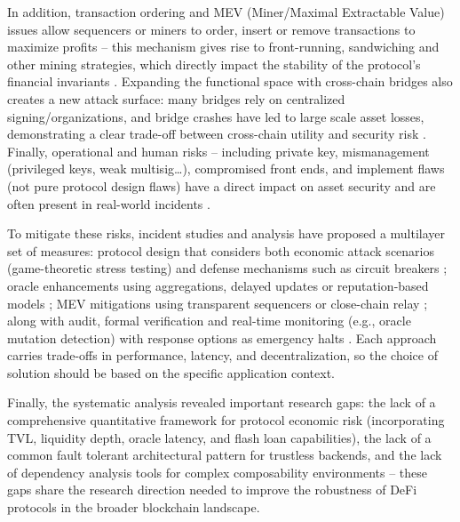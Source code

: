 In addition, transaction ordering and MEV (Miner/Maximal Extractable Value) issues allow sequencers or miners to order, insert or remove transactions to maximize profits – this mechanism gives rise to front-running, sandwiching and other mining strategies, which directly impact the stability of the protocol's financial invariants \cite{zhou2023sok}. Expanding the functional space with cross-chain bridges also creates a new attack surface: many bridges rely on centralized signing/organizations, and bridge crashes have led to large scale asset losses, demonstrating a clear trade-off between cross-chain utility and security risk \cite{li2022securitydefi}. Finally, operational and human risks – including private key, mismanagement (privileged keys, weak multisig…), compromised front ends, and implement flaws (not pure protocol design flaws) have a direct impact on asset security and are often present in real-world incidents \cite{liu2024defiscams}.

To mitigate these risks, incident studies and analysis have proposed a multilayer set of measures: protocol design that considers both economic attack scenarios (game-theoretic stress testing) and defense mechanisms such as circuit breakers \cite{zhou2023sok}; oracle enhancements using aggregations, delayed updates or reputation-based models \cite{li2022securitydefi}; MEV mitigations using transparent sequencers or close-chain relay \cite{zhou2023sok}; along with audit, formal verification and real-time monitoring (e.g., oracle mutation detection) with response options as emergency halts \cite{zhou2023sok, li2022securitydefi}. Each approach carries trade-offs in performance, latency, and decentralization, so the choice of solution should be based on the specific application context.

Finally, the systematic analysis revealed important research gaps: the lack of a comprehensive quantitative framework for protocol economic risk (incorporating TVL, liquidity depth, oracle latency, and flash loan capabilities), the lack of a common fault tolerant architectural pattern for trustless backends, and the lack of dependency analysis tools for complex composability environments – these gaps share the research direction needed to improve the robustness of DeFi protocols in the broader blockchain landscape.